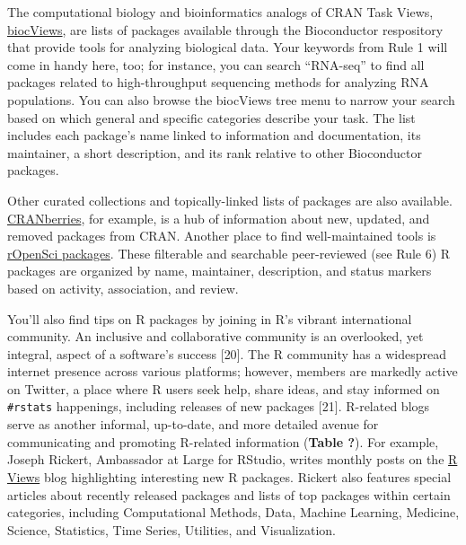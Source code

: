 \documentclass[10pt,letterpaper]{article}
\begin{document}
The computational biology and bioinformatics analogs of CRAN Task Views,
\href{https://www.bioconductor.org/packages/release/BiocViews.html\#___Software}{biocViews},
are lists of packages available through the Bioconductor respository
that provide tools for analyzing biological data. Your keywords from
Rule 1 will come in handy here, too; for instance, you can search
``RNA-seq'' to find all packages related to high-throughput sequencing
methods for analyzing RNA populations. You can also browse the biocViews
tree menu to narrow your search based on which general and specific
categories describe your task. The list includes each package's name
linked to information and documentation, its maintainer, a short
description, and its rank relative to other Bioconductor packages.

Other curated collections and topically-linked lists of packages are
also available.
\href{http://dirk.eddelbuettel.com/cranberries/index.html}{CRANberries},
for example, is a hub of information about new, updated, and removed
packages from CRAN. Another place to find well-maintained tools is
\href{https://ropensci.org/packages/}{rOpenSci packages}. These
filterable and searchable peer-reviewed (see Rule 6) R packages are
organized by name, maintainer, description, and status markers based on
activity, association, and review.

You'll also find tips on R packages by joining in R's vibrant
international community. An inclusive and collaborative community is an
overlooked, yet integral, aspect of a software's success {[}20{]}. The R
community has a widespread internet presence across various platforms;
however, members are markedly active on Twitter, a place where R users
seek help, share ideas, and stay informed on \texttt{\#rstats}
happenings, including releases of new packages {[}21{]}. R-related blogs
serve as another informal, up-to-date, and more detailed avenue for
communicating and promoting R-related information (\textbf{Table ?}).
For example, Joseph Rickert, Ambassador at Large for RStudio, writes
monthly posts on the \href{https://rviews.rstudio.com/}{R Views} blog
highlighting interesting new R packages. Rickert also features special
articles about recently released packages and lists of top packages
within certain categories, including Computational Methods, Data,
Machine Learning, Medicine, Science, Statistics, Time Series, Utilities,
and Visualization.
\end{document}
